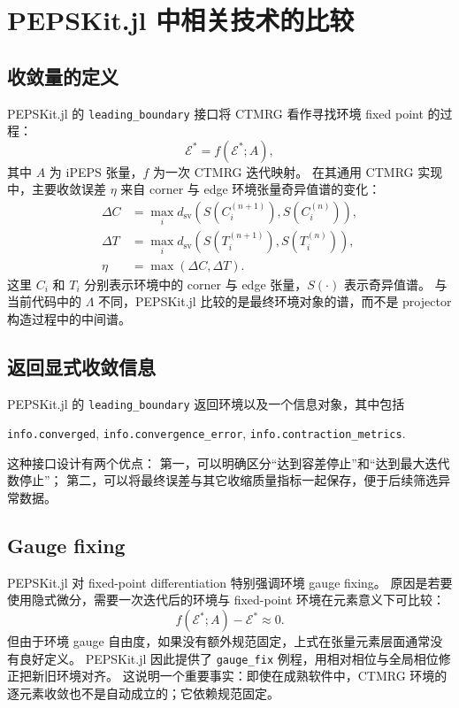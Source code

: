 \documentclass[11pt,a4paper]{ctexart}
\newcommand{\ctmrg}{CTMRG}
\newcommand{\ipeps}{iPEPS}
\newcommand{\pepskit}{PEPSKit.jl}
\begin{document}
\section{\pepskit{} 中相关技术的比较}

\subsection{收敛量的定义}

\pepskit{} 的 \texttt{leading\_boundary} 接口将 \ctmrg{} 看作寻找环境 fixed point 的过程：
\begin{equation}
  \mathcal{E}^{*}=f(\mathcal{E}^{*};A),
\end{equation}
其中 $A$ 为 \ipeps{} 张量，$f$ 为一次 \ctmrg{} 迭代映射。
在其通用 \ctmrg{} 实现中，主要收敛误差 $\eta$ 来自 corner 与 edge 环境张量奇异值谱的变化：
\begin{align}
  \Delta C
  &=
  \max_i d_{\mathrm{sv}}\!\left(S(C_i^{(n+1)}),S(C_i^{(n)})\right),\\
  \Delta T
  &=
  \max_i d_{\mathrm{sv}}\!\left(S(T_i^{(n+1)}),S(T_i^{(n)})\right),\\
  \eta
  &=
  \max(\Delta C,\Delta T).
\end{align}
这里 $C_i$ 和 $T_i$ 分别表示环境中的 corner 与 edge 张量，$S(\cdot)$ 表示奇异值谱。
与当前代码中的 $\Lambda$ 不同，\pepskit{} 比较的是最终环境对象的谱，而不是 projector 构造过程中的中间谱。

\subsection{返回显式收敛信息}

\pepskit{} 的 \texttt{leading\_boundary} 返回环境以及一个信息对象，其中包括
\begin{center}
\texttt{info.converged},\qquad
\texttt{info.convergence\_error},\qquad
\texttt{info.contraction\_metrics}.
\end{center}
这种接口设计有两个优点：
第一，可以明确区分“达到容差停止”和“达到最大迭代数停止”；
第二，可以将最终误差与其它收缩质量指标一起保存，便于后续筛选异常数据。

\subsection{Gauge fixing}

\pepskit{} 对 fixed-point differentiation 特别强调环境 gauge fixing。
原因是若要使用隐式微分，需要一次迭代后的环境与 fixed-point 环境在元素意义下可比较：
\begin{equation}
  f(\mathcal{E}^{*};A)-\mathcal{E}^{*}\approx 0.
\end{equation}
但由于环境 gauge 自由度，如果没有额外规范固定，上式在张量元素层面通常没有良好定义。
\pepskit{} 因此提供了 \texttt{gauge\_fix} 例程，用相对相位与全局相位修正把新旧环境对齐。
这说明一个重要事实：即使在成熟软件中，\ctmrg{} 环境的逐元素收敛也不是自动成立的；它依赖规范固定。
\end{document}
